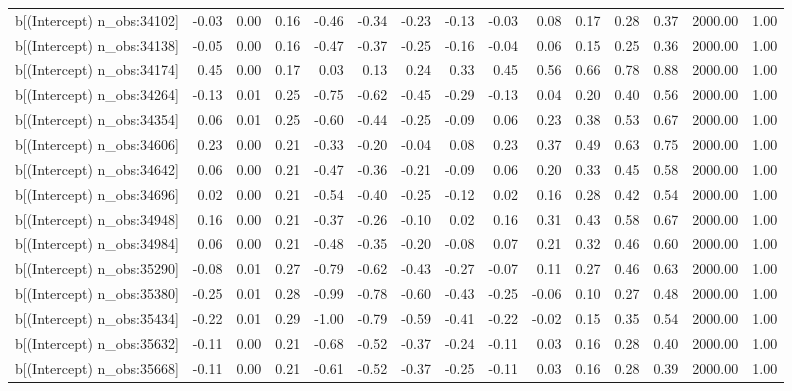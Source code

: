 \begin{table}[ht]
\begin{tabular}{rrrrrrrrrrrrrrr}
  b[(Intercept) n\_obs:34102] & -0.03 & 0.00 & 0.16 & -0.46 & -0.34 & -0.23 & -0.13 & -0.03 & 0.08 & 0.17 & 0.28 & 0.37 & 2000.00 & 1.00 \\ 
  b[(Intercept) n\_obs:34138] & -0.05 & 0.00 & 0.16 & -0.47 & -0.37 & -0.25 & -0.16 & -0.04 & 0.06 & 0.15 & 0.25 & 0.36 & 2000.00 & 1.00 \\ 
  b[(Intercept) n\_obs:34174] & 0.45 & 0.00 & 0.17 & 0.03 & 0.13 & 0.24 & 0.33 & 0.45 & 0.56 & 0.66 & 0.78 & 0.88 & 2000.00 & 1.00 \\ 
  b[(Intercept) n\_obs:34264] & -0.13 & 0.01 & 0.25 & -0.75 & -0.62 & -0.45 & -0.29 & -0.13 & 0.04 & 0.20 & 0.40 & 0.56 & 2000.00 & 1.00 \\ 
  b[(Intercept) n\_obs:34354] & 0.06 & 0.01 & 0.25 & -0.60 & -0.44 & -0.25 & -0.09 & 0.06 & 0.23 & 0.38 & 0.53 & 0.67 & 2000.00 & 1.00 \\ 
  b[(Intercept) n\_obs:34606] & 0.23 & 0.00 & 0.21 & -0.33 & -0.20 & -0.04 & 0.08 & 0.23 & 0.37 & 0.49 & 0.63 & 0.75 & 2000.00 & 1.00 \\ 
  b[(Intercept) n\_obs:34642] & 0.06 & 0.00 & 0.21 & -0.47 & -0.36 & -0.21 & -0.09 & 0.06 & 0.20 & 0.33 & 0.45 & 0.58 & 2000.00 & 1.00 \\ 
  b[(Intercept) n\_obs:34696] & 0.02 & 0.00 & 0.21 & -0.54 & -0.40 & -0.25 & -0.12 & 0.02 & 0.16 & 0.28 & 0.42 & 0.54 & 2000.00 & 1.00 \\ 
  b[(Intercept) n\_obs:34948] & 0.16 & 0.00 & 0.21 & -0.37 & -0.26 & -0.10 & 0.02 & 0.16 & 0.31 & 0.43 & 0.58 & 0.67 & 2000.00 & 1.00 \\ 
  b[(Intercept) n\_obs:34984] & 0.06 & 0.00 & 0.21 & -0.48 & -0.35 & -0.20 & -0.08 & 0.07 & 0.21 & 0.32 & 0.46 & 0.60 & 2000.00 & 1.00 \\ 
  b[(Intercept) n\_obs:35290] & -0.08 & 0.01 & 0.27 & -0.79 & -0.62 & -0.43 & -0.27 & -0.07 & 0.11 & 0.27 & 0.46 & 0.63 & 2000.00 & 1.00 \\ 
  b[(Intercept) n\_obs:35380] & -0.25 & 0.01 & 0.28 & -0.99 & -0.78 & -0.60 & -0.43 & -0.25 & -0.06 & 0.10 & 0.27 & 0.48 & 2000.00 & 1.00 \\ 
  b[(Intercept) n\_obs:35434] & -0.22 & 0.01 & 0.29 & -1.00 & -0.79 & -0.59 & -0.41 & -0.22 & -0.02 & 0.15 & 0.35 & 0.54 & 2000.00 & 1.00 \\ 
  b[(Intercept) n\_obs:35632] & -0.11 & 0.00 & 0.21 & -0.68 & -0.52 & -0.37 & -0.24 & -0.11 & 0.03 & 0.16 & 0.28 & 0.40 & 2000.00 & 1.00 \\ 
  b[(Intercept) n\_obs:35668] & -0.11 & 0.00 & 0.21 & -0.61 & -0.52 & -0.37 & -0.25 & -0.11 & 0.03 & 0.16 & 0.28 & 0.39 & 2000.00 & 1.00 \\ 

\end{tabular}
\end{table}
